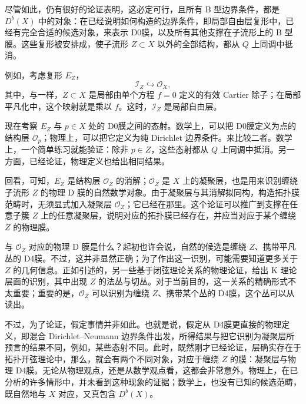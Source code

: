 尽管如此，仍有很好的论证表明，这必定可行，且所有 B 型边界条件，都是 $D^b(X)$ 中的对象：在已经说明如何构造的边界条件，即局部自由层复形中，已经有完全合适的候选对象，来表示 D0膜，以及所有其他支撑在子流形上的 B 型膜。这些复形被安排成，使子流形 $Z\subset X$ 以外的全部结构，都从 $Q$ 上同调中抵消。

\begin{example*}
例如，考虑复形 $E_Z$，
\[
\mathcal{I}_Z\hookrightarrow\mathcal{O}_X,
\]
其中，与一样，$Z\subset X$ 是局部由单个方程 $f=0$ 定义的有效 Cartier 除子；在局部平凡化中，这个映射就是乘以 $f$。这时，$\mathcal{I}_Z$ 是局部自由层。
\end{example*}

现在考察 $E_Z$ 与 $p\in X$ 处的 D0膜之间的态射。数学上，可以把 D0膜定义为点的结构层 $\mathcal{O}_p$；物理上，可以把它定义为纯 Dirichlet 边界条件。来比较二者。数学上，一个简单练习就能验证：除非 $p\in Z$，这些态射都从 $Q$ 上同调中抵消。另一方面，已经论证，物理定义也给出相同结果。

回看，可知，$E_Z$ 是结构层 $\mathcal{O}_Z$ 的消解；$\mathcal{O}_Z$ 是 $X$ 上的凝聚层，也是用来识别缠绕子流形 $Z$ 的物理 D 膜的自然数学对象。由于凝聚层与其消解拟同构，构造拓扑膜范畴时，无须显式加入凝聚层 $\mathcal{O}_Z$；它已经在那里。这个论证可以推广到支撑在任意子簇 $Z$ 上的任意凝聚层，说明对应的拓扑膜已经存在，并应当对应于某个缠绕 $Z$ 的物理膜。

与 $\mathcal{O}_Z$ 对应的物理 D 膜是什么？起初也许会说，自然的候选是缠绕 $Z$、携带平凡丛的 D4膜。不过，这并非显然正确；为了作出这一识别，可能需要知道更多关于 $Z$ 的几何信息。正如引述的，另一些基于闭弦理论关系的物理论证，给出 K 理论层面的识别，其中出现 $Z$ 的法丛与切丛。对于当前目的，这一关系的精确形式不太重要；重要的是，$\mathcal{O}_Z$ 可以识别为缠绕 $Z$、携带某个丛的 D4膜，这个丛可以从读出。

不过，为了论证，假定事情并非如此。也就是说，假定从 D4膜更直接的物理定义，即混合 Dirichlet--Neumann 边界条件出发，所得结果与把它识别为凝聚层所预言的结果不同，例如，某些态射不同。此时，既然刚才已经论证，层确实存在于拓扑开弦理论中，那么，就会有两个不同对象，对应于缠绕 $Z$ 的膜：凝聚层与物理 D4膜。无论从物理观点，还是从数学观点看，这都会非常意外。物理上，在已分析的许多情形中，并未看到这种现象的证据；数学上，也没有已知的候选范畴，既自然地与 $X$ 对应，又真包含 $D^b(X)$。

